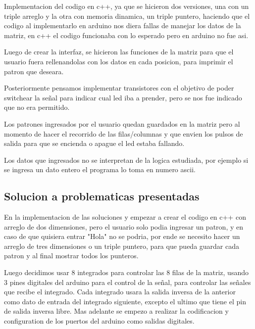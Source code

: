 \documentclass{article}
\begin{document}
Implementacion del codigo en c++, ya que se hicieron dos versiones, una con un triple arreglo y la otra con memoria dinamica, un triple puntero, haciendo que el codigo al implementarlo en arduino nos diera fallas de manejar los datos de la matriz, en c++ el codigo funcionaba con lo esperado pero en arduino no fue asi.

 \vspace{1cm}

Luego de crear la interfaz, se hicieron las funciones de la matriz para que el usuario fuera rellenandolas con los datos en cada posicion, para imprimir el patron que deseara.
 \vspace{1cm}




 \vspace{1cm}
 Posteriormente pensamos implementar transistores con el objetivo de poder switchear la señal para indicar cual led iba a prender, pero se nos fue indicado que no era permitido.
 
\vspace{1cm}

Los patrones ingresados por el usuario quedan guardados en la matriz pero al momento de hacer el recorrido de las filas/columnas y que envien los pulsos de salida para que se encienda o apague el led estaba fallando.

Los datos que ingresados no se interpretan de la logica estudiada, por ejemplo si se ingresa un dato entero el programa lo toma en numero ascii.




\vspace{14cm}

\subsection{Solucion a problematicas presentadas}

 En la implementacion de las soluciones y empezar a crear el codigo en c++ con arreglo de dos dimensiones, pero el usuario solo podia ingresar un patron, y en caso de que quisiera entrar "Hola" no se podria, por ende se necesito hacer un arreglo de tres dimensiones o un triple puntero, para que pueda guardar cada patron y al final mostrar todos los punteros.
 
   \vspace{1cm}
   
 
 Luego decidimos usar 8 integrados para controlar las 8 filas de la matriz, usando 3 pines digitales del arduino para el control de la señal, para controlar las señales que recibe el integrado.
 Cada integrado usara la salida inversa de la anterior como dato de entrada del integrado siguiente, excepto el ultimo que tiene el pin de salida inversa libre.
 Mas adelante se empezo a realizar la codificacion y configuration de los puertos del arduino como salidas digitales. 
 
\end{document}
